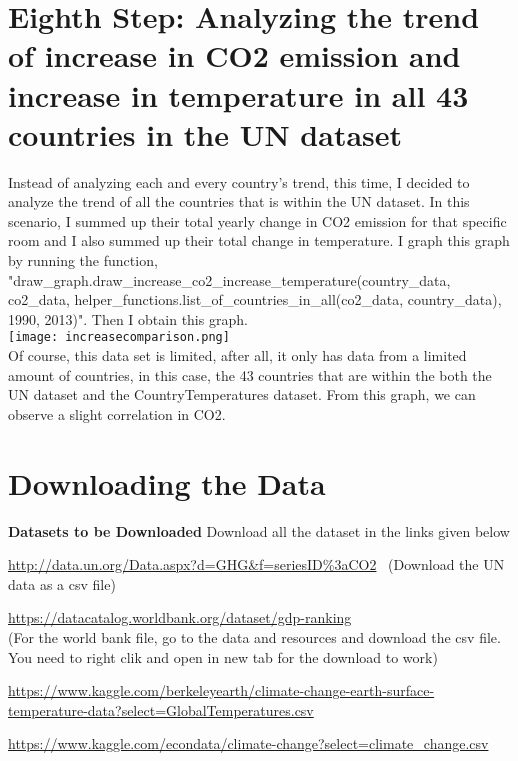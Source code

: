 \documentclass[fontsize=11pt]{article}
\begin{document}
\section{Eighth Step: Analyzing the trend of increase in CO2 emission and increase in temperature in all 43 countries in the UN dataset}
Instead of analyzing each and every country's trend, this time, I decided to analyze the trend of all the countries that is within the UN dataset. In this scenario, I summed up their total yearly change in CO2 emission for that specific room and I also summed up their total change in temperature. I graph this graph by running the function, "draw\_graph.draw\_increase\_co2\_increase\_temperature(country\_data, co2\_data, helper\_functions.list\_of\_countries\_in\_all(co2\_data, country\_data), 1990, 2013)". Then I obtain this graph.
\\
\texttt{[image: increasecomparison.png]}
\\
Of course, this data set is limited, after all, it only has data from a limited amount of countries, in this case, the 43 countries that are within the both the UN dataset and the CountryTemperatures dataset. From this graph, we can observe a slight correlation in CO2.

\section*{Downloading the Data}

\textbf{Datasets to be Downloaded}
Download all the dataset in the links given below

\href{http://data.un.org/Data.aspx?d=GHG&f=seriesID\%3aCO2}{http://data.un.org/Data.aspx?d=GHG&f=seriesID\%3aCO2}
\ (Download the UN data as a csv file)

\href{https://datacatalog.worldbank.org/dataset/gdp-ranking}{https://datacatalog.worldbank.org/dataset/gdp-ranking}
\\ (For the world bank file, go to the data and resources and download the csv file. You need to right clik and open in new tab for the download to work)

\href{https://www.kaggle.com/berkeleyearth/climate-change-earth-surface-temperature-data?select=GlobalTemperatures.csv}{https://www.kaggle.com/berkeleyearth/climate-change-earth-surface-temperature-data?select=GlobalTemperatures.csv}

\href{https://www.kaggle.com/econdata/climate-change?select=climate\_change.csv}{https://www.kaggle.com/econdata/climate-change?select=climate\_change.csv}
\end{document}
